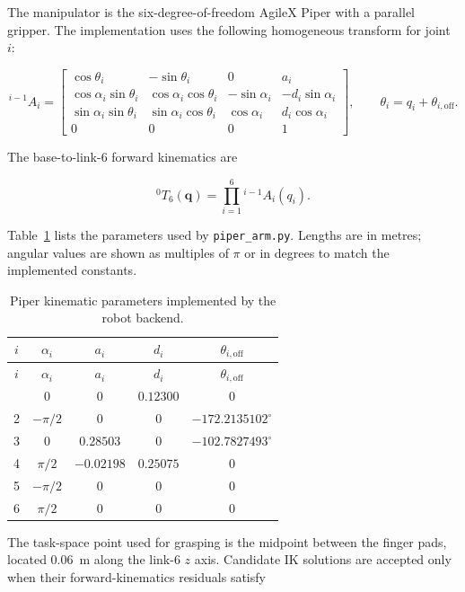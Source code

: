 The manipulator is the six-degree-of-freedom AgileX Piper with a parallel
gripper.  The implementation uses the following homogeneous transform for
joint~$i$:

\begin{equation}
{}^{i-1}\!A_i =
\begin{bmatrix}
\cos\theta_i & -\sin\theta_i & 0 & a_i \\
\cos\alpha_i\sin\theta_i & \cos\alpha_i\cos\theta_i & -\sin\alpha_i & -d_i\sin\alpha_i \\
\sin\alpha_i\sin\theta_i & \sin\alpha_i\cos\theta_i & \cos\alpha_i & d_i\cos\alpha_i \\
0 & 0 & 0 & 1
\end{bmatrix},
\qquad
\theta_i=q_i+\theta_{i,\mathrm{off}} .
\label{eq:piper-dh-transform}
\end{equation}

The base-to-link-6 forward kinematics are

\begin{equation}
{}^{0}\!T_6(\mathbf q)=\prod_{i=1}^{6}{}^{i-1}\!A_i(q_i).
\label{eq:piper-fk}
\end{equation}

Table~\ref{tab:piper-dh} lists the parameters used by
\texttt{piper\_arm.py}. Lengths are in metres; angular values are shown as
multiples of $\pi$ or in degrees to match the implemented constants.

\begin{longtable}{@{}ccccc@{}}
\caption{Piper kinematic parameters implemented by the robot backend.}
\label{tab:piper-dh}\\
\toprule
$i$ & $\alpha_i$ & $a_i$ & $d_i$ & $\theta_{i,\mathrm{off}}$ \\
\midrule
\endfirsthead
\toprule
$i$ & $\alpha_i$ & $a_i$ & $d_i$ & $\theta_{i,\mathrm{off}}$ \\
\midrule
\endhead
\bottomrule
\endfoot
1 & $0$ & $0$ & $0.12300$ & $0$ \\
2 & $-\pi/2$ & $0$ & $0$ & $-172.2135102^\circ$ \\
3 & $0$ & $0.28503$ & $0$ & $-102.7827493^\circ$ \\
4 & $\pi/2$ & $-0.02198$ & $0.25075$ & $0$ \\
5 & $-\pi/2$ & $0$ & $0$ & $0$ \\
6 & $\pi/2$ & $0$ & $0$ & $0$ \\
\end{longtable}

The task-space point used for grasping is the midpoint between the finger
pads, located $0.06$~m along the link-6 $z$ axis.  Candidate IK solutions are
accepted only when their forward-kinematics residuals satisfy

